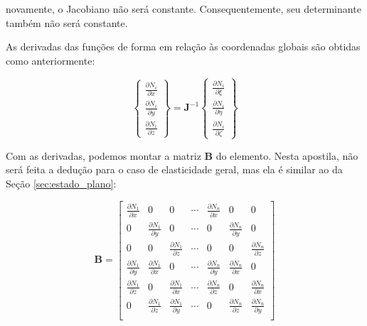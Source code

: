         \noindent novamente, o Jacobiano não será constante. Consequentemente, seu determinante também não será constante.


        As derivadas das funções de forma em relação às coordenadas globais são obtidas como anteriormente:

        \begin{equation}
            \begin{Bmatrix}
                \frac{\partial N_i}{\partial x} \\
                \frac{\partial N_i}{\partial y} \\
                \frac{\partial N_i}{\partial z}
            \end{Bmatrix} = 
            \mathbf{J}^{-1}
            \begin{Bmatrix}
                \frac{\partial N_i}{\partial \xi} \\
                \frac{\partial N_i}{\partial \eta} \\
                \frac{\partial N_i}{\partial \zeta}
            \end{Bmatrix}
        \end{equation}

        Com as derivadas, podemos montar a matriz $\mathbf{B}$ do elemento. Nesta apostila, não será feita a dedução para o caso de elasticidade geral, mas ela é similar ao da Seção \ref{sec:estado_plano}:

        \begin{equation}
            \mathbf{B} = 
            \begin{bmatrix}
                \frac{\partial N_1}{\partial x} & 0 & 0 & \cdots & \frac{\partial N_n}{\partial x} & 0 & 0\\
                0 & \frac{\partial N_1}{\partial y} & 0 & \cdots & 0 & \frac{\partial N_n}{\partial y} & 0\\
                0 & 0 & \frac{\partial N_1}{\partial z} & \cdots & 0 & 0 & \frac{\partial N_n}{\partial z} \\
                \frac{\partial N_1}{\partial y} & \frac{\partial N_1}{\partial x} & 0 & \cdots & \frac{\partial N_n}{\partial y} & \frac{\partial N_n}{\partial x} & 0\\
                \frac{\partial N_1}{\partial z} & 0 & \frac{\partial N_1}{\partial x} & \cdots & \frac{\partial N_n}{\partial z} & 0 & \frac{\partial N_n}{\partial x}\\
                0 & \frac{\partial N_1}{\partial z} & \frac{\partial N_1}{\partial y} & \cdots & 0 & \frac{\partial N_n}{\partial z} & \frac{\partial N_n}{\partial y}\\
            \end{bmatrix}
        \end{equation}

